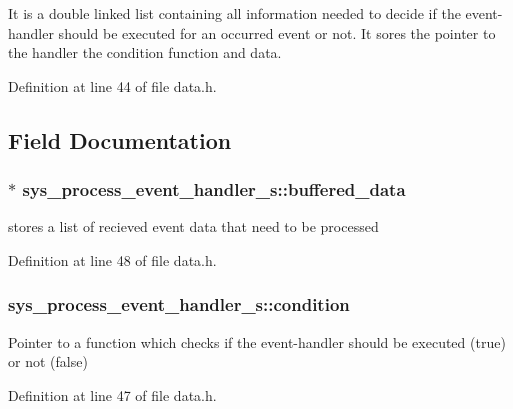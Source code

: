 It is a double linked list containing all information needed to decide if the event-\/handler should be executed for an occurred event or not. It sores the pointer to the handler the condition function and data. 

Definition at line 44 of file data.\+h.



\subsection{Field Documentation}
\hypertarget{structsys__process__event__handler__s_adbcb330724f201fb328fb91d2c6353e3}{}
\subsubsection[{buffered\+\_\+data}]{$\ast$ sys\+\_\+process\+\_\+event\+\_\+handler\+\_\+s\+::buffered\+\_\+data}\label{structsys__process__event__handler__s_adbcb330724f201fb328fb91d2c6353e3}
stores a list of recieved event data that need to be processed 

Definition at line 48 of file data.\+h.

\hypertarget{structsys__process__event__handler__s_a43ea89783cb8b5cfd0896410f1f7a691}{}
\subsubsection[{condition}]{ sys\+\_\+process\+\_\+event\+\_\+handler\+\_\+s\+::condition}\label{structsys__process__event__handler__s_a43ea89783cb8b5cfd0896410f1f7a691}
Pointer to a function which checks if the event-\/handler should be executed (true) or not (false) 

Definition at line 47 of file data.\+h.

\hypertarget{structsys__process__event__handler__s_a4b799aaf40561daed132a1a1d688ecd8}{}
